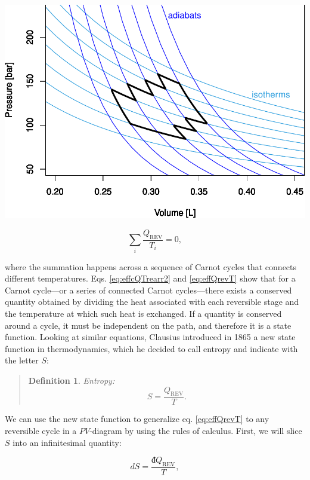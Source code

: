 \documentclass[
  9pt,
]{extbook}
\theoremstyle{definition}
\newtheorem{definition}{Definition}[chapter]
\theoremstyle{definition}
\theoremstyle{definition}
\theoremstyle{remark}
\begin{document}
\begin{center}\includegraphics[width=0.7\linewidth]{pchem1_files/figure-latex/unnamed-chunk-12-1} \end{center}

\begin{equation}
\sum_i \frac{Q_{\mathrm{REV}}}{T_i} = 0,
\label{eq:effQrevT}
\end{equation}

where the summation happens across a sequence of Carnot cycles that connects different temperatures. Eqs. \eqref{eq:effcQTrearr2} and \eqref{eq:effQrevT} show that for a Carnot cycle---or a series of connected Carnot cycles---there exists a conserved quantity obtained by dividing the heat associated with each reversible stage and the temperature at which such heat is exchanged. If a quantity is conserved around a cycle, it must be independent on the path, and therefore it is a state function. Looking at similar equations, Clausius introduced in 1865 a new state function in thermodynamics, which he decided to call entropy and indicate with the letter \(S\):

\begin{quote}
\begin{definition}
\protect\hypertarget{def:entropy}{}{\label{def:entropy} }\emph{Entropy:} \begin{equation}
S = \frac{Q_{\mathrm{REV}}}{T}.
\end{equation}
\end{definition}
\end{quote}

We can use the new state function to generalize eq. \eqref{eq:effQrevT} to any reversible cycle in a \(PV\)-diagram by using the rules of calculus. First, we will slice \(S\) into an infinitesimal quantity:

\begin{equation}
dS = \frac{đQ_{\mathrm{REV}}}{T},
\label{eq:dentropy}
\end{equation}
\end{document}

